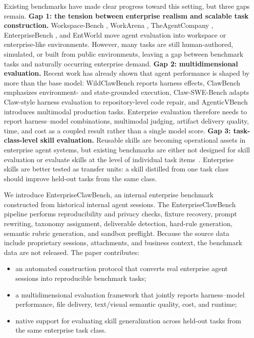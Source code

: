 \documentclass[11pt, a4paper, copyright, frontis]{frontis}
\newcommand{\ecb}{EnterpriseClawBench}
\newcommand{\ecbpipe}{EnterpriseClawBench pipeline}
\newcommand{\hm}{harness--model}
\begin{document}
Existing benchmarks have made clear progress toward this setting, but three gaps remain. \textbf{Gap 1: the tension between enterprise realism and scalable task construction.} Workspace-Bench \citep{workspacebench2026}, WorkArena \citep{workarena2024}, TheAgentCompany \citep{theagentcompany2025}, EnterpriseBench \citep{enterprisebench2025}, and EntWorld \citep{entworld2026} move agent evaluation into workspace or enterprise-like environments. However, many tasks are still human-authored, simulated, or built from public environments, leaving a gap between benchmark tasks and naturally occurring enterprise demand. \textbf{Gap 2: multidimensional evaluation.} Recent work has already shown that agent performance is shaped by more than the base model: WildClawBench \citep{wildclawbench2026} reports harness effects, ClawBench \citep{clawbench2026} emphasizes environment- and state-grounded execution, Claw-SWE-Bench \citep{clawswebench2026} adapts Claw-style harness evaluation to repository-level code repair, and AgenticVBench \citep{agenticvbench2026} introduces multimodal production tasks. Enterprise evaluation therefore needs to report \hm{} combinations, multimodal judging, artifact delivery quality, time, and cost as a coupled result rather than a single model score. \textbf{Gap 3: task-class-level skill evaluation.} Reusable skills are becoming operational assets in enterprise agent systems, but existing benchmarks are either not designed for skill evaluation or evaluate skills at the level of individual task items~\citep{skillsbench2026}. Enterprise skills are better tested as transfer units: a skill distilled from one task class should improve held-out tasks from the same class.

We introduce \ecb{}, an internal enterprise benchmark constructed from historical internal agent sessions. The \ecbpipe{} performs reproducibility and privacy checks, fixture recovery, prompt rewriting, taxonomy assignment, deliverable detection, hard-rule generation, semantic rubric generation, and sandbox preflight. Because the source data include proprietary sessions, attachments, and business context, the benchmark data are not released. The paper contributes:
\begin{itemize}[leftmargin=*,itemsep=1pt,topsep=2pt]
  \item an automated construction protocol that converts real enterprise agent sessions into reproducible benchmark tasks;
  \item a multidimensional evaluation framework that jointly reports \hm{} performance, file delivery, text/visual semantic quality, cost, and runtime;
  \item native support for evaluating skill generalization across held-out tasks from the same enterprise task class.
\end{itemize}
\end{document}
